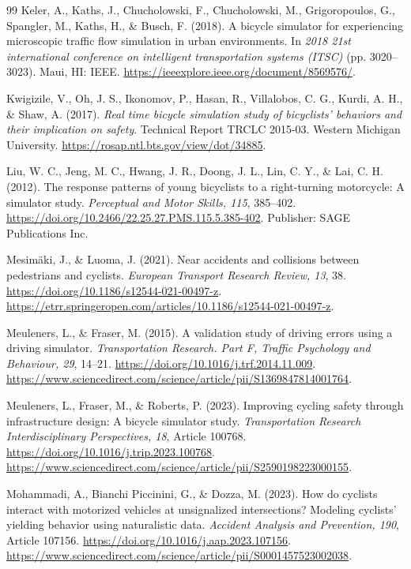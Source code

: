 \begin{thebibliography}{99}
Keler, A., Kaths, J., Chucholowski, F., Chucholowski, M., Grigoropoulos, G.,
Spangler, M., Kaths, H., \& Busch, F. (2018). A bicycle simulator for
experiencing microscopic traffic flow simulation in urban environments. In
\emph{2018 21st international conference on intelligent transportation systems
(ITSC)} (pp. 3020--3023). Maui, HI: IEEE.
\url{https://ieeexplore.ieee.org/document/8569576/}.

Kwigizile, V., Oh, J. S., Ikonomov, P., Hasan, R., Villalobos, C. G., Kurdi,
A. H., \& Shaw, A. (2017). \emph{Real time bicycle simulation study of
bicyclists' behaviors and their implication on safety}. Technical Report TRCLC
2015-03. Western Michigan University.
\url{https://rosap.ntl.bts.gov/view/dot/34885}.

Liu, W. C., Jeng, M. C., Hwang, J. R., Doong, J. L., Lin, C. Y., \& Lai, C. H.
(2012). The response patterns of young bicyclists to a right-turning motorcycle:
A simulator study. \emph{Perceptual and Motor Skills, 115}, 385--402.
\url{https://doi.org/10.2466/22.25.27.PMS.115.5.385-402}. Publisher: SAGE
Publications Inc.

Mesimäki, J., \& Luoma, J. (2021). Near accidents and collisions between
pedestrians and cyclists. \emph{European Transport Research Review, 13}, 38.
\url{https://doi.org/10.1186/s12544-021-00497-z}.
\url{https://etrr.springeropen.com/articles/10.1186/s12544-021-00497-z}.

Meuleners, L., \& Fraser, M. (2015). A validation study of driving errors using
a driving simulator. \emph{Transportation Research. Part F, Traffic Psychology
and Behaviour, 29}, 14--21. \url{https://doi.org/10.1016/j.trf.2014.11.009}.
\url{https://www.sciencedirect.com/science/article/pii/S1369847814001764}.

Meuleners, L., Fraser, M., \& Roberts, P. (2023). Improving cycling safety
through infrastructure design: A bicycle simulator study. \emph{Transportation
Research Interdisciplinary Perspectives, 18}, Article 100768.
\url{https://doi.org/10.1016/j.trip.2023.100768}.
\url{https://www.sciencedirect.com/science/article/pii/S2590198223000155}.

Mohammadi, A., Bianchi Piccinini, G., \& Dozza, M. (2023). How do cyclists
interact with motorized vehicles at unsignalized intersections? Modeling
cyclists' yielding behavior using naturalistic data. \emph{Accident Analysis and
Prevention, 190}, Article 107156.
\url{https://doi.org/10.1016/j.aap.2023.107156}.
\url{https://www.sciencedirect.com/science/article/pii/S0001457523002038}.


\end{thebibliography}
